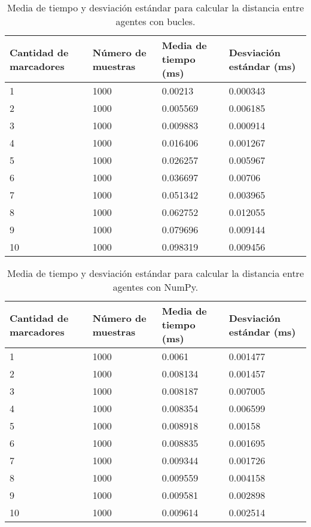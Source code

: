 \begin{table}[H]
	\centering
	\resizebox{\textwidth}{!} {
	\begin{tabular}{|l|l|l|l|}
		\hline
		\textbf{Cantidad de marcadores} & \textbf{Número de muestras} & \textbf{Media de tiempo (ms)} & \textbf{Desviación estándar (ms)} \\ \hline
		1 & 1000 & 0.00213 & 0.000343 \\ \hline
		2 & 1000 & 0.005569 & 0.006185 \\ \hline
		3 & 1000 & 0.009883 & 0.000914 \\ \hline
		4 & 1000 & 0.016406 & 0.001267 \\ \hline
		5 & 1000 & 0.026257 & 0.005967 \\ \hline
		6 & 1000 & 0.036697 & 0.00706 \\ \hline
		7 & 1000 & 0.051342 & 0.003965 \\ \hline
		8 & 1000 & 0.062752 & 0.012055 \\ \hline
		9 & 1000 & 0.079696 & 0.009144 \\ \hline
		10 & 1000 & 0.098319 & 0.009456 \\ \hline
	\end{tabular}}
	\caption{Media de tiempo y desviación estándar para calcular la distancia entre agentes con bucles.}
	\label{cuadro:tiempos_distancias_for}
\end{table}

\begin{table}[H]
	\centering
	\resizebox{\textwidth}{!} {
	\begin{tabular}{|l|l|l|l|}
		\hline
		\textbf{Cantidad de marcadores} & \textbf{Número de muestras} & \textbf{Media de tiempo (ms)} & \textbf{Desviación estándar (ms)} \\ \hline
		1 & 1000 & 0.0061 & 0.001477 \\ \hline
		2 & 1000 & 0.008134 & 0.001457 \\ \hline
		3 & 1000 & 0.008187 & 0.007005 \\ \hline
		4 & 1000 & 0.008354 & 0.006599 \\ \hline
		5 & 1000 & 0.008918 & 0.00158 \\ \hline
		6 & 1000 & 0.008835 & 0.001695 \\ \hline
		7 & 1000 & 0.009344 & 0.001726 \\ \hline
		8 & 1000 & 0.009559 & 0.004158 \\ \hline
		9 & 1000 & 0.009581 & 0.002898 \\ \hline
		10 & 1000 & 0.009614 & 0.002514 \\ \hline
	\end{tabular}}
	\caption{Media de tiempo y desviación estándar para calcular la distancia entre agentes con NumPy.}
	\label{cuadro:tiempos_distancias_numpy}
\end{table}

